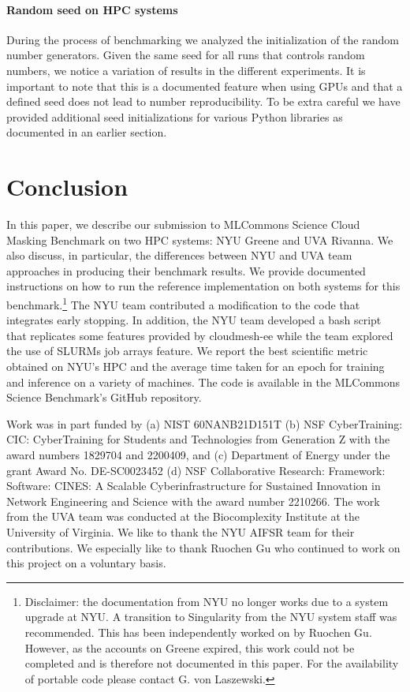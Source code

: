 \documentclass[sigplan,screen]{acmart}
\begin{document}
\paragraph{Random seed on HPC systems} During the process of benchmarking we analyzed the initialization of the random number generators. Given the same seed for all runs that controls random numbers, we notice a variation of results in the different experiments. It is important to note that this is a documented feature when using GPUs and that a defined seed does not lead to number reproducibility. To be extra careful we have provided additional seed initializations for various Python libraries as documented in an earlier section.

\section{Conclusion}

In this paper, we describe our submission to MLCommons Science Cloud Masking Benchmark on two HPC systems: NYU Greene and UVA Rivanna. We also discuss, in particular, the differences between NYU and UVA team approaches in producing their benchmark results. We provide documented instructions on how to run the reference implementation on both systems for this benchmark.\footnote{Disclaimer: the documentation from NYU no longer works due to a system upgrade at NYU. A transition to Singularity from the NYU system staff was recommended. This has been independently worked on by Ruochen Gu. However, as the accounts on Greene expired, this work could not be completed and is therefore not documented in this paper. For the availability of portable code please contact G. von Laszewski.} 
The NYU team contributed a modification to the code that integrates early stopping. In addition, the NYU team developed a bash script that replicates some features provided by cloudmesh-ee while the team explored the use of SLURMs job arrays feature. We report the best scientific metric obtained on NYU's HPC and the average time taken for an epoch for training and inference on a variety of machines. The code is available in the MLCommons Science Benchmark's GitHub repository.



\begin{acks}

  Work was in part funded by (a) NIST 60NANB21D151T (b) NSF
  CyberTraining: CIC: CyberTraining for Students and Technologies from
  Generation Z with the award numbers 1829704 and 2200409, and (c)
  Department of Energy under the grant Award No. DE-SC0023452 (d) NSF
  Collaborative Research: Framework: Software: CINES: A Scalable
  Cyberinfrastructure for Sustained Innovation in Network Engineering
  and Science with the award number 2210266. The work from the UVA
  team was conducted at the Biocomplexity Institute at
  the University of Virginia.  We like to thank the NYU AIFSR team for
  their contributions. We especially like to thank Ruochen Gu who
  continued to work on this project on a voluntary basis.


\end{acks}
\end{document}
